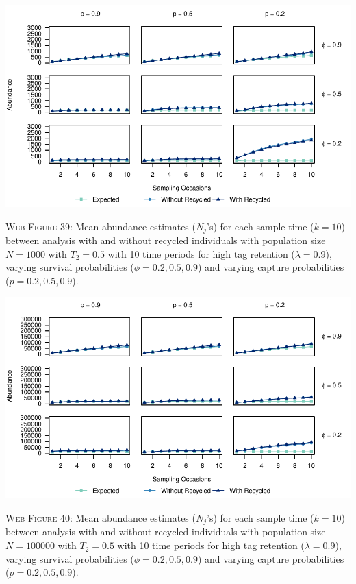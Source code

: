 \documentclass[]{article}
\begin{document}
\includegraphics{Appendix_files/figure-latex/39_abundance_H_GJSTL4-1.pdf}

\textsc{Web Figure 39:} Mean abundance estimates (\(N_j\)'s) for each
sample time (\(k=10\)) between analysis with and without recycled
individuals with population size \(N=1000\) with \(T_2=0.5\) with 10
time periods for high tag retention (\(\lambda=0.9\)), varying survival
probabilities (\(\phi=0.2,0.5,0.9\)) and varying capture probabilities
(\(p=0.2,0.5,0.9\)).

\includegraphics{Appendix_files/figure-latex/40_abundance_H_GJSTL3-1.pdf}

\textsc{Web Figure 40:} Mean abundance estimates (\(N_j\)'s) for each
sample time (\(k=10\)) between analysis with and without recycled
individuals with population size \(N=100000\) with \(T_2=0.5\) with 10
time periods for high tag retention (\(\lambda=0.9\)), varying survival
probabilities (\(\phi=0.2,0.5,0.9\)) and varying capture probabilities
(\(p=0.2,0.5,0.9\)).

\newpage
\end{document}
